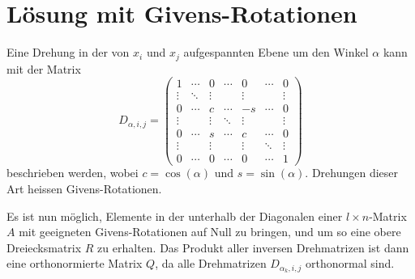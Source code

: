 %
%
%
\section{Lösung mit Givens-Rotationen
\label{qr:section:loesung}}
Eine Drehung in der von $x_i$ und $x_j$ aufgespannten Ebene um den Winkel $\alpha$ kann mit der Matrix
\begin{equation}
D_{\alpha,i,j}=
\begin{pmatrix}
1     &\cdots&0     &\cdots&0     &\cdots&0\\
\vdots&\ddots&\vdots&      &\vdots&      &\vdots\\
0     &\cdots&c     &\cdots&-s    &\cdots&0\\
\vdots&      &\vdots&\ddots&\vdots&      &\vdots\\
0     &\cdots&s     &\cdots&c     &\cdots&0\\
\vdots&      &\vdots&      &\vdots&\ddots&\vdots\\
0     &\cdots&0     &\cdots&0     &\cdots&1
\end{pmatrix}
\end{equation}
beschrieben werden, wobei $c=\cos(\alpha)$ und $s=\sin(\alpha)$.
Drehungen dieser Art heissen Givens-Rotationen.

Es ist nun möglich, Elemente in der unterhalb der Diagonalen einer $l\times n $-Matrix $A$ mit geeigneten Givens-Rotationen auf Null zu bringen, und um so eine obere Dreiecksmatrix $R$ zu erhalten.
Das Produkt aller inversen Drehmatrizen ist dann eine orthonormierte Matrix $Q$, da alle Drehmatrizen $D_{\alpha_k,i,j}$ orthonormal sind.

